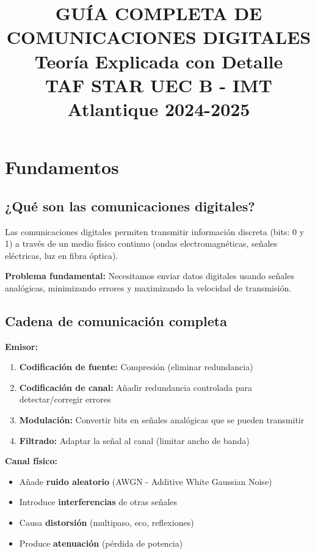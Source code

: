\documentclass[10pt,a4paper]{article}
\title{\textbf{\LARGE GUÍA COMPLETA DE COMUNICACIONES DIGITALES}\\
\Large Teoría Explicada con Detalle\\
\large TAF STAR UEC B - IMT Atlantique 2024-2025}
\author{}
\date{}
\begin{document}
\maketitle

\tableofcontents
\newpage

\section{Fundamentos}

\subsection{¿Qué son las comunicaciones digitales?}

Las comunicaciones digitales permiten transmitir información discreta (bits: 0 y 1) a través de un medio físico continuo (ondas electromagnéticas, señales eléctricas, luz en fibra óptica).

\textbf{Problema fundamental:} Necesitamos enviar datos digitales usando señales analógicas, minimizando errores y maximizando la velocidad de transmisión.

\subsection{Cadena de comunicación completa}

\textbf{Emisor:}
\begin{enumerate}
\item \textbf{Codificación de fuente:} Compresión (eliminar redundancia)
\item \textbf{Codificación de canal:} Añadir redundancia controlada para detectar/corregir errores
\item \textbf{Modulación:} Convertir bits en señales analógicas que se pueden transmitir
\item \textbf{Filtrado:} Adaptar la señal al canal (limitar ancho de banda)
\end{enumerate}

\textbf{Canal físico:}
\begin{itemize}
\item Añade \textbf{ruido aleatorio} (AWGN - Additive White Gaussian Noise)
\item Introduce \textbf{interferencias} de otras señales
\item Causa \textbf{distorsión} (multipaso, eco, reflexiones)
\item Produce \textbf{atenuación} (pérdida de potencia)
\end{itemize}
\end{document}
